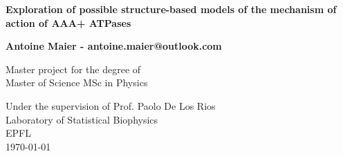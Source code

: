 \begin{titlepage}
    \begin{center}
        \vspace*{1cm}
            
        \Huge
        \textbf{Exploration of possible structure-based models of the mechanism of action of AAA+ ATPases}
            
        \vspace{0.5cm}
        \LARGE
            
        \vspace{1.5cm}
            
        \textbf{Antoine Maier - antoine.maier@outlook.com}
            
        \vfill
            
        Master project for the degree of\\
        Master of Science MSc in Physics
            
        \vspace{0.8cm}
        \Large
        
        Under the supervision of Prof. Paolo De Los Rios\\
        Laboratory of Statistical Biophysics\\
        EPFL\\
        \today
            
    \end{center}
\end{titlepage}